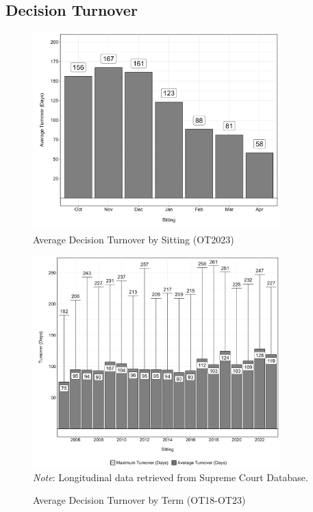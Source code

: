 \begin{landscape}
\subsection{\centering Decision Turnover}

\begin{figure}[H]
\centering
\caption{Average Decision Turnover by Sitting (OT2023)}
\vspace{1.5mm}
\includegraphics[width = 0.85\textwidth]{Figures/statpack_figures/decision_turnover_OT23.png}
\end{figure}

\newpage

\begin{figure}[H]
\centering
\caption{Average Decision Turnover by Term (OT18-OT23)}
\vspace{1.5mm}
\includegraphics[width = 0.85\textwidth]{Figures/statpack_figures/decision_turnover_OT18_OT23.png} \\
\vspace{1.5mm}
\footnotesize{\emph{Note}: Longitudinal data retrieved from Supreme Court Database.}

\end{figure}


\end{landscape}



